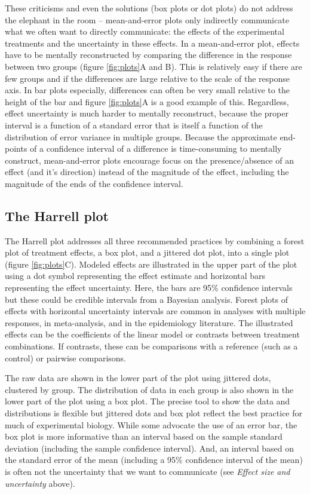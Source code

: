 \documentclass[]{article}
\theoremstyle{definition}
\theoremstyle{definition}
\theoremstyle{definition}
\theoremstyle{remark}
\begin{document}
These criticisms and even the solutions (box plots or dot plots) do not
address the elephant in the room -- mean-and-error plots only indirectly
communicate what we often want to directly communicate: the effects of
the experimental treatments and the uncertainty in these effects. In a
mean-and-error plot, effects have to be mentally reconstructed by
comparing the difference in the response between two groups (figure
\ref{fig:plots}A and B). This is relatively easy if there are few groups
and if the differences are large relative to the scale of the response
axis. In bar plots especially, differences can often be very small
relative to the height of the bar and figure \ref{fig:plots}A is a good
example of this. Regardless, effect uncertainty is much harder to
mentally reconstruct, because the proper interval is a function of a
standard error that is itself a function of the distribution of error
variance in multiple groups. Because the approximate end-points of a
confidence interval of a difference is time-consuming to mentally
construct, mean-and-error plots encourage focus on the presence/absence
of an effect (and it's direction) instead of the magnitude of the
effect, including the magnitude of the ends of the confidence interval.

\subsection*{The Harrell plot}\label{the-harrell-plot}

The Harrell plot addresses all three recommended practices by combining
a forest plot of treatment effects, a box plot, and a jittered dot plot,
into a single plot (figure \ref{fig:plots}C). Modeled effects are
illustrated in the upper part of the plot using a dot symbol
representing the effect estimate and horizontal bars representing the
effect uncertainty. Here, the bars are 95\% confidence intervals but
these could be credible intervals from a Bayesian analysis. Forest plots
of effects with horizontal uncertainty intervals are common in analyses
with multiple responses, in meta-analysis, and in the epidemiology
literature. The illustrated effects can be the coefficients of the
linear model or contrasts between treatment combinations. If contrasts,
these can be comparisons with a reference (such as a control) or
pairwise comparisons.

The raw data are shown in the lower part of the plot using jittered
dots, clustered by group. The distribution of data in each group is also
shown in the lower part of the plot using a box plot. The precise tool
to show the data and distributions is flexible but jittered dots and box
plot reflect the best practice for much of experimental biology. While
some advocate the use of an error bar, the box plot is more informative
than an interval based on the sample standard deviation (including the
sample confidence interval). And, an interval based on the standard
error of the mean (including a 95\% confidence interval of the mean) is
often not the uncertainty that we want to communicate (see \emph{Effect
size and uncertainty} above).
\end{document}
